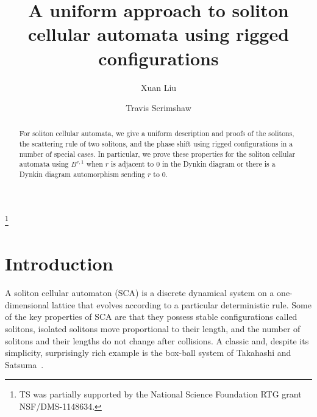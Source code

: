 \documentclass[reqno]{amsart}
\theoremstyle{plain}
\theoremstyle{definition}
\numberwithin{equation}{section}
\begin{document}
\title[Uniform approach to SCA using rigged configurations]{A uniform approach to soliton cellular automata using rigged configurations}

\author[X.~Liu]{Xuan Liu}
\address[X.~Liu]{School of Mathematics, University of Minnesota, 206 Church St.\ SE, Minneapolis, MN 55455}

\author[T.~Scrimshaw]{Travis Scrimshaw}
\address[T.~Scrimshaw]{School of Mathematics and Physics, University of Queensland, St.\ Lucia, QLD 4072, Australia}


\thanks{TS was partially supported by the National Science Foundation RTG grant NSF/DMS-1148634.}

\begin{abstract}
For soliton cellular automata, we give a uniform description and proofs of the solitons, the scattering rule of two solitons, and the phase shift using rigged configurations in a number of special cases.
In particular, we prove these properties for the soliton cellular automata using $B^{r,1}$ when $r$ is adjacent to $0$ in the Dynkin diagram or there is a Dynkin diagram automorphism sending $r$ to $0$.
\end{abstract}

\maketitle



\section{Introduction}
\label{sec:introduction}

A soliton cellular automaton (SCA) is a discrete dynamical system on a one-dimensional lattice that evolves according to a particular deterministic rule.
Some of the key properties of SCA are that they possess stable configurations called solitons, isolated solitons move proportional to their length, and the number of solitons and their lengths do not change after collisions.
A classic and, despite its simplicity, surprisingly rich example is the box-ball system of Takahashi and Satsuma~\cite{TS90}.
\end{document}
